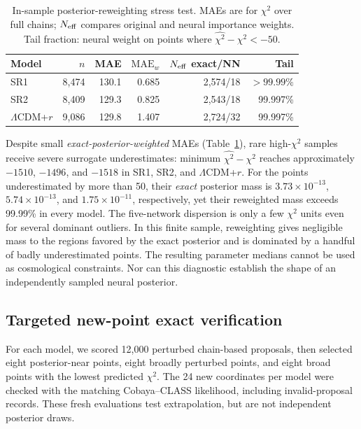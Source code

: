 \documentclass[a4paper,conference,10pt]{IEEEtran}
\begin{document}
\begin{table}[t]
\caption{In-sample posterior-reweighting stress test. MAEs are for
$\chi^2$ over full chains; $N_{\rm eff}$ compares original and neural
importance weights. Tail fraction: neural weight on points where
$\widehat{\chi^2}-\chi^2<-50$.}
\label{tab:post}
\centering\footnotesize
\setlength{\tabcolsep}{3pt}
\begin{tabular}{@{}lrrrrr@{}}
\toprule
Model & $n$ & MAE & $\mathrm{MAE}_{w}$ & $N_{\rm eff}$ exact/NN & Tail \\
\midrule
SR1 & 8,474 & 130.1 & 0.685 & 2,574/18 & $>99.99\%$ \\
SR2 & 8,409 & 129.3 & 0.825 & 2,543/18 & 99.997\% \\
$\Lambda$CDM+$r$ & 9,086 & 129.8 & 1.407 & 2,724/32 & 99.997\% \\
\bottomrule
\end{tabular}
\end{table}

Despite small \emph{exact-posterior-weighted} MAEs (Table~\ref{tab:post}),
rare high-$\chi^2$ samples receive severe surrogate underestimates:
minimum $\widehat{\chi^2}-\chi^2$ reaches approximately $-1510$,
$-1496$, and $-1518$ in SR1, SR2, and $\Lambda$CDM+$r$.
For the points underestimated by more than 50, their \emph{exact}
posterior mass is $3.73\times10^{-13}$, $5.74\times10^{-13}$,
and $1.75\times10^{-11}$, respectively, yet their reweighted
mass exceeds 99.99\% in every model. The five-network dispersion
is only a few $\chi^2$ units even for several dominant outliers.
In this finite sample, reweighting gives negligible mass to the regions favored by the exact posterior and is dominated by a handful of badly underestimated points. The resulting parameter medians cannot be used as cosmological constraints. Nor can this diagnostic establish the shape of an independently sampled neural posterior.

\subsection{Targeted new-point exact verification}
For each model, we scored 12,000 perturbed chain-based proposals, then selected eight posterior-near points, eight broadly perturbed points, and eight broad points with the lowest predicted $\chi^2$. The 24 new coordinates per model were checked with the matching Cobaya--CLASS likelihood, including invalid-proposal records. These fresh evaluations test extrapolation, but are not independent posterior draws.
\end{document}
